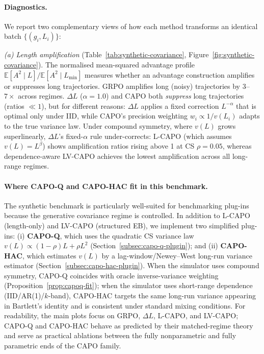 \paragraph{Diagnostics.}
We report two complementary views of how each method transforms an identical batch $\{(g_i, L_i)\}$:

\noindent
\emph{(a) Length amplification} (Table~\ref{tab:synthetic-covariance}, Figure~\ref{fig:synthetic-covariance}).
The normalised mean-squared advantage profile $\mathbb{E}[A^2 \mid L] / \mathbb{E}[A^2 \mid L_{\min}]$ measures whether an advantage construction amplifies or suppresses long trajectories.
GRPO amplifies long (noisy) trajectories by $3$--$7\times$ across regimes.
$\Delta L$ ($\alpha = 1.0$) and CAPO both \emph{suppress} long trajectories (ratios $\ll 1$), but for different reasons:
$\Delta L$ applies a fixed correction $L^{-\alpha}$ that is optimal only under IID, while CAPO's precision weighting $w_i \propto 1/v(L_i)$ adapts to the true variance law.
Under compound symmetry, where $v(L)$ grows superlinearly, $\Delta L$'s fixed-$\alpha$ rule under-corrects: L-CAPO (which assumes $v(L) = L^{\beta}$) shows amplification ratios rising above 1 at CS $\rho = 0.05$, whereas dependence-aware LV-CAPO achieves the lowest amplification across all long-range regimes.

\paragraph{Where CAPO-Q and CAPO-HAC fit in this benchmark.}
The synthetic benchmark is particularly well-suited for benchmarking plug-ins because the generative covariance regime is controlled. In addition to L-CAPO (length-only) and LV-CAPO (structured EB), we implement two simplified plug-ins:
(i) \textbf{CAPO-Q}, which uses the quadratic CS variance law $v(L)\propto (1-\rho)L+\rho L^2$ (Section~\ref{subsec:capo-q-plugin}); and (ii) \textbf{CAPO-HAC}, which estimates $v(L)$ by a lag-window/Newey--West long-run variance estimator (Section~\ref{subsec:capo-hac-plugin}). When the simulator uses compound symmetry, CAPO-Q coincides with oracle inverse-variance weighting (Proposition~\ref{prop:capoq-fit}); when the simulator uses short-range dependence (IID/AR(1)/$k$-band), CAPO-HAC targets the same long-run variance appearing in Bartlett’s identity and is consistent under standard mixing conditions. For readability, the main plots focus on GRPO, $\Delta L$, L-CAPO, and LV-CAPO; CAPO-Q and CAPO-HAC behave as predicted by their matched-regime theory and serve as practical ablations between the fully nonparametric and fully parametric ends of the CAPO family.

